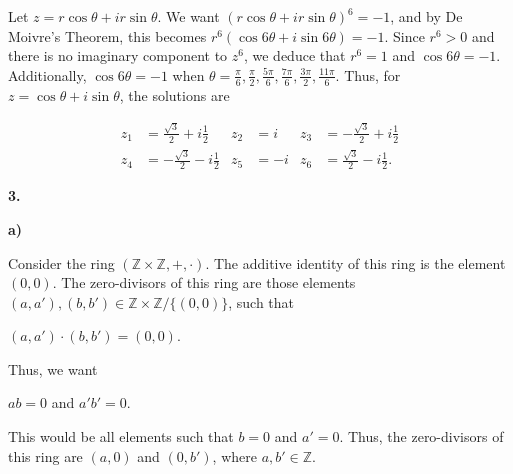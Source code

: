 \documentclass[12pt, a4paper]{article}
\begin{document}
\vspace{4mm}

\begin{addmargin}[2.8em]{2.8em}

    \noindent Let $z=r\cos{\theta}+ir\sin{\theta}$. We want $(r\cos{\theta}+ir\sin{\theta})^6=-1$, and by De Moivre's Theorem, this becomes $r^6(\cos{6\theta}+i\sin{6\theta})=-1$. Since $r^6>0$ and there is no imaginary component to $z^6$, we deduce that $r^6=1$ and $\cos{6\theta}=-1$. Additionally, $\cos{6\theta}=-1$ when $\theta=\frac{\pi}{6}, \frac{\pi}{2}, \frac{5\pi}{6}, \frac{7\pi}{6}, \frac{3\pi}{2}, \frac{11\pi}{6}$. Thus, for $z=\cos{\theta}+i\sin{\theta}$, the solutions are
    
    \begin{align*}
        z_1 & = \frac{\sqrt{3}}{2}+i\frac{1}{2} 
       & z_2 & = i 
       & z_3 & = -\frac{\sqrt{3}}{2}+i\frac{1}{2} \\
        z_4 & = -\frac{\sqrt{3}}{2}-i\frac{1}{2} 
       & z_5 & = -i 
       & z_6 & = \frac{\sqrt{3}}{2}-i\frac{1}{2}.
    \end{align*}

\end{addmargin}

\noindent\textbf{3.}\par

\textbf{a)}

\vspace{4mm}



\begin{addmargin}[2.8em]{2.8em}

    \noindent Consider the ring $(\mathbb{Z}\times\mathbb{Z},+,\cdot)$. The additive identity of this ring is the element $(0,0)$. The zero-divisors of this ring are those elements $(a,a'),(b,b')\in\mathbb{Z}\times\mathbb{Z}/\{(0,0)\}$, such that

    \vspace{2mm}

    \centerline{$(a,a')\cdot(b,b')=(0,0)$.}

    \vspace{2mm}

    \noindent Thus, we want 

    \vspace{2mm}

    \centerline{$ab=0$ and $a'b'=0$.}

    \vspace{2mm}

    \noindent This would be all elements such that $b=0$ and $a'=0$. Thus, the zero-divisors of this ring are $(a,0)$ and $(0,b')$, where $a,b'\in\mathbb{Z}$.

\end{addmargin}
\end{document}
